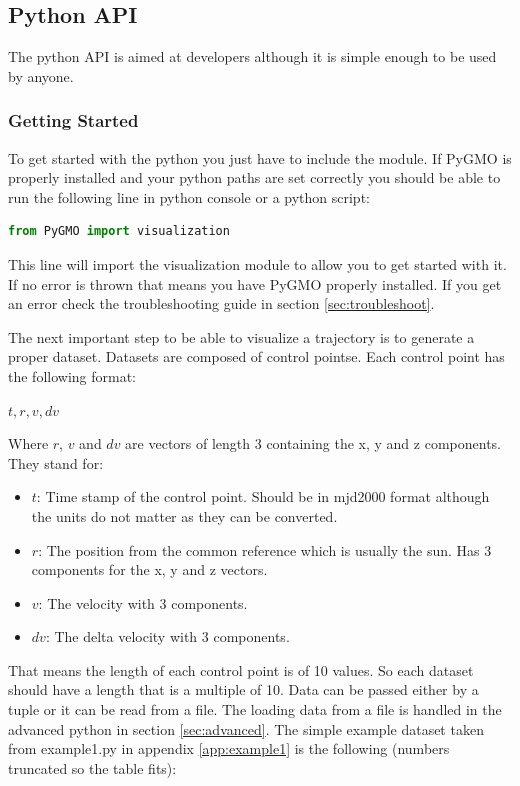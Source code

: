 \documentclass[a4paper,11pt]{article}
\begin{document}
\subsection{Python API}

The \gls{python} \gls{API} is aimed at developers although it is simple enough to be used by anyone.

\subsubsection{Getting Started}\label{sec:started}

To get started with the python you just have to include the module. If PyGMO is properly installed and your python paths are set correctly you should be able to run the following line in python console or a python script:
\begin{lstlisting}[language=Python,breakatwhitespace=true]
from PyGMO import visualization
\end{lstlisting}
This line will import the visualization module to allow you to get started with it. If no error is thrown that means you have PyGMO properly installed. If you get an error check the troubleshooting guide in section \ref{sec:troubleshoot}.

The next important step to be able to visualize a trajectory is to generate a proper dataset. Datasets are composed of control pointse. Each control point has the following format:

$ t, r, v, dv $

Where $r$, $v$ and $dv$ are vectors of length 3 containing the x, y and z components. They stand for:

\begin{itemize}
\item $t$: Time stamp of the control point. Should be in \gls{mjd2000}\cite{mjd2000} format although the units do not matter as they can be converted.
\item $r$: The position from the common reference which is usually the sun. Has 3 components for the x, y and z vectors.
\item $v$: The velocity with 3 components.
\item $dv$: The delta velocity with 3 components.
\end{itemize}

That means the length of each control point is of 10 values. So each dataset should have a length that is a multiple of 10. Data can be passed either by a tuple or it can be read from a file. The loading data from a file is handled in the advanced \gls{python} in section \ref{sec:advanced}. The simple example dataset taken from example1.py in appendix \ref{app:example1} is the following (numbers truncated so the table fits):
\end{document}
